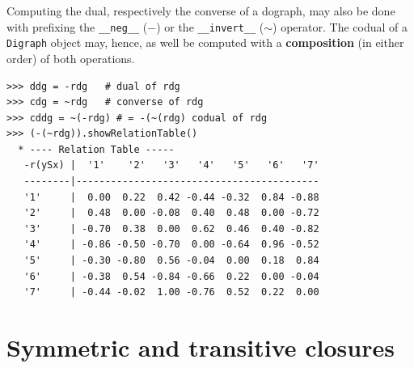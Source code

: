 Computing the dual, respectively the converse of a dograph, may also be done with prefixing the \texttt{\_\_neg\_\_} ($-$) or the \texttt{\_\_invert\_\_} ($\sim$) operator. The codual of a \texttt{Digraph} object may, hence, as well be computed with a \textbf{composition} (in either order) of both operations.
\begin{lstlisting}[caption={Computing the dual, the converse and the codual of a digraph},label=list:2.8]
>>> ddg = -rdg   # dual of rdg
>>> cdg = ~rdg   # converse of rdg
>>> cddg = ~(-rdg) # = -(~(rdg) codual of rdg
>>> (-(~rdg)).showRelationTable()
  * ---- Relation Table -----
   -r(ySx) |  '1'    '2'   '3'   '4'   '5'   '6'   '7'	    
   --------|------------------------------------------
   '1'     |  0.00  0.22  0.42 -0.44 -0.32  0.84 -0.88	 
   '2'     |  0.48  0.00 -0.08  0.40  0.48  0.00 -0.72	 
   '3'     | -0.70  0.38  0.00  0.62  0.46  0.40 -0.82	 
   '4'     | -0.86 -0.50 -0.70  0.00 -0.64  0.96 -0.52	 
   '5'     | -0.30 -0.80  0.56 -0.04  0.00  0.18  0.84	 
   '6'     | -0.38  0.54 -0.84 -0.66  0.22  0.00 -0.04	 
   '7'     | -0.44 -0.02  1.00 -0.76  0.52  0.22  0.00	 
\end{lstlisting}
  
\section{Symmetric and transitive closures}
\label{sec:2.7}

